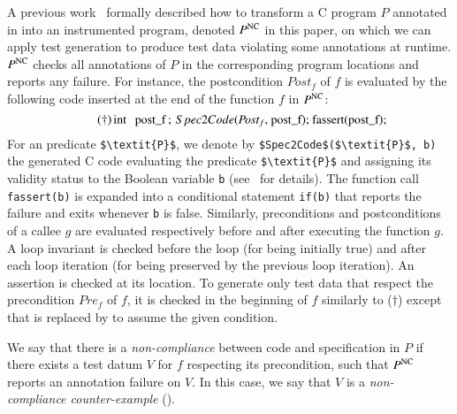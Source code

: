 A previous work~\cite{Petiot/SCAM14} formally described 
how to transform a C program $P$ annotated in \eacsl
into an instrumented program, denoted  $P^\mathrm{NC}$ in this paper,
on which we can apply test generation to produce test data
violating some annotations at runtime.
$P^\mathrm{NC}$ checks all annotations of $P$
in the corresponding program locations
and reports any failure.
For instance, the postcondition $\textit{Post}_f$ of $f$
is evaluated by the following code inserted at the end of the function $f$ in $P^\mathrm{NC}$:
\begin{equation}\tag{$\dagger$}
\mbox{\lstinline[mathescape]'int post_f;  $\ Spec2Code$($\textit{Post}_f$, post_f); fassert(post_f);'}
\end{equation}
For an \eacsl predicate \lstinline[mathescape]'$\textit{P}$',
we denote by \lstinline[mathescape]'$Spec2Code$($\textit{P}$, b)'
the generated C code  evaluating the predicate
\lstinline[mathescape]'$\textit{P}$'
and assigning its validity status to the Boolean 
variable \lstinline[mathescape]'b' (see~\cite{Petiot/SCAM14} for details).
The function call \lstinline[mathescape]'fassert(b)'
is expanded into a conditional
statement \lstinline[mathescape]'if(b)' that reports the failure and exits 
whenever \lstinline[mathescape]'b' is false.
Similarly, preconditions and postconditions of a callee $g$
are evaluated respectively before and after executing the function $g$.
A loop invariant is checked before the loop (for being initially true) 
and after each loop iteration (for being preserved by the previous
loop iteration). 
An assertion is checked at its location.
To generate only test data  that respect
the precondition $\textit{Pre}_f$ of $f$,
it is checked  in the beginning of $f$ 
similarly to ($\dagger$)
except that \fassert
is replaced by \fassume
to assume the given condition.

\vspace{-2mm}
\begin{definition} 
\label{def:NC}
We say that there is a \emph{non-compliance} between code and specification in $P$
if there exists  a test datum $V$ for $f$ respecting its precondition,
such that $P^{\mathrm{NC}}$ reports an annotation failure on $V$.
In this case, we say that $V$ is a \emph{non-compliance counter-example} (\NCCE).
\end{definition}
\vspace{-2mm}

